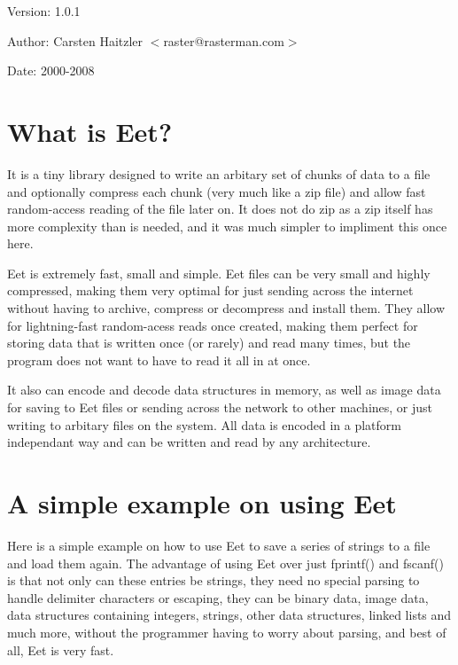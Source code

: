  \begin{Desc}
\item[Version:]1.0.1 \end{Desc}
\begin{Desc}
\item[Author:]Carsten Haitzler $<$raster@rasterman.com$>$ \end{Desc}
\begin{Desc}
\item[Date:]2000-2008\end{Desc}
\hypertarget{index_intro}{}\section{What is Eet?}\label{index_intro}
It is a tiny library designed to write an arbitary set of chunks of data to a file and optionally compress each chunk (very much like a zip file) and allow fast random-access reading of the file later on. It does not do zip as a zip itself has more complexity than is needed, and it was much simpler to impliment this once here.

Eet is extremely fast, small and simple. Eet files can be very small and highly compressed, making them very optimal for just sending across the internet without having to archive, compress or decompress and install them. They allow for lightning-fast random-acess reads once created, making them perfect for storing data that is written once (or rarely) and read many times, but the program does not want to have to read it all in at once.

It also can encode and decode data structures in memory, as well as image data for saving to Eet files or sending across the network to other machines, or just writing to arbitary files on the system. All data is encoded in a platform independant way and can be written and read by any architecture.\hypertarget{index_example}{}\section{A simple example on using Eet}\label{index_example}
Here is a simple example on how to use Eet to save a series of strings to a file and load them again. The advantage of using Eet over just fprintf() and fscanf() is that not only can these entries be strings, they need no special parsing to handle delimiter characters or escaping, they can be binary data, image data, data structures containing integers, strings, other data structures, linked lists and much more, without the programmer having to worry about parsing, and best of all, Eet is very fast.



